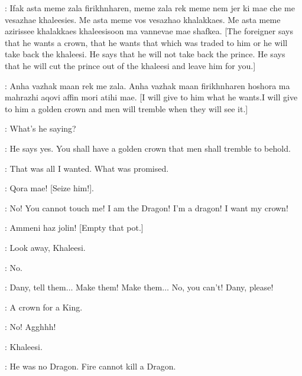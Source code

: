 \IRRI: Ifak asta meme zala firikhnharen, meme zala rek meme nem jer ki mae che me vesazhae khaleesies. Me asta meme vos vesazhao khalakkaes. Me asta meme azirissee khalakkaes khaleesisoon ma vannevae mae shafkea. [The foreigner says that he wants a crown, that he wants that which was traded to him or he will take back the khaleesi. He says that he will not take back the prince. He says that he will cut the prince out of the khaleesi and leave him for you.] 

\DROGO: Anha vazhak maan rek me zala. Anha vazhak maan firikhnharen hoshora ma mahrazhi aqovi affin mori atihi mae. [I will give to him what he wants.I will give to him a golden crown and men will tremble when they will see it.] 

\VISERYS:  What's he saying? 

\DAENERYS:  He says yes. You shall have a golden crown that men shall tremble to behold. 

\VISERYS:  That was all I wanted.  What was promised.  

\DROGO:  Qora mae! [Seize him!]. 


\VISERYS:   No! You cannot touch me!  I am the Dragon! I'm a dragon! I want my crown! 

\DROGO: Ammeni haz jolin! [Empty that pot.] 


\JORAH:  Look away, Khaleesi. 

\DAENERYS:  No. 

\VISERYS:  Dany, tell them$\ldots$  Make them! Make them$\ldots$  No, you can't!  Dany, please!  


\DROGO: A crown for a King. 


\VISERYS:  No! Agghhh!  


\JORAH:  Khaleesi. 

\DAENERYS: He was no Dragon. Fire cannot kill a Dragon. 



